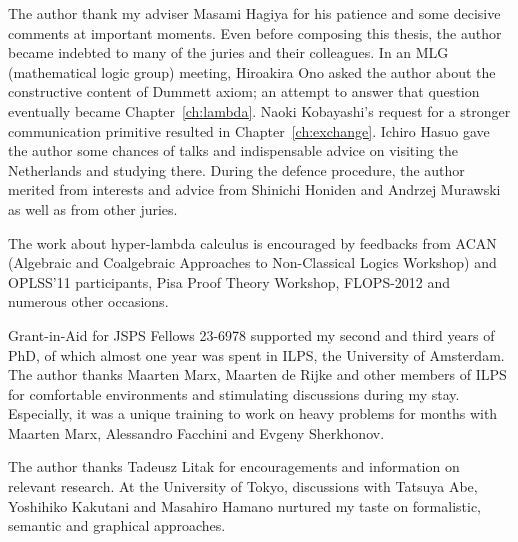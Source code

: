 \begin{acknowledge}
 The author thank my adviser Masami Hagiya for his patience and some decisive
 comments at important moments.
 Even before composing this thesis, the author became indebted to many of the
 juries and their colleagues.
 In an MLG (mathematical logic group) meeting, Hiroakira Ono asked the author
 about the constructive content of Dummett axiom; an attempt to answer
 that question eventually became
 Chapter~\ref{ch:lambda}.
 Naoki Kobayashi's request for a stronger communication primitive
 resulted in Chapter~\ref{ch:exchange}.
 Ichiro Hasuo gave the author some chances of talks and
 indispensable advice on visiting the Netherlands
 and studying there.
 During the defence procedure,
 the author merited from interests and advice from Shinichi Honiden and
 Andrzej Murawski as well as from other juries.

 The work about hyper-lambda calculus is encouraged by feedbacks from
 ACAN (Algebraic and Coalgebraic Approaches to
 Non-Classical Logics Workshop) and OPLSS'11 participants,
 Pisa Proof Theory Workshop, FLOPS-2012
 and numerous other occasions.

 Grant-in-Aid for JSPS Fellows 23-6978 supported
 my second and third years of PhD, of which almost one year was spent
 in ILPS, the University of Amsterdam.
 The author thanks Maarten Marx, Maarten de Rijke and other members of ILPS for
 comfortable environments and stimulating discussions during my stay.
 Especially, it was a unique training to work on heavy problems for months with Maarten Marx, Alessandro
 Facchini and Evgeny Sherkhonov.

 The author thanks Tadeusz Litak for encouragements and
 information on relevant research.
 At the University of Tokyo,
 discussions with Tatsuya Abe, Yoshihiko Kakutani and Masahiro Hamano
 nurtured my taste on formalistic, semantic and graphical approaches.
\end{acknowledge}
